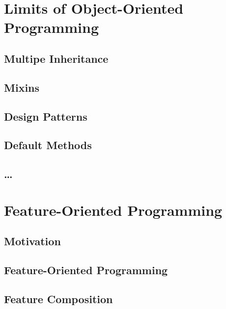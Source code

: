

\subtitle{7. Language-Based Techniques}
\author{Thomas Thüm}





\section{Limits of Object-Oriented Programming}

\subsection{Multipe Inheritance}
\subsection{Mixins}
\subsection{Design Patterns}
\subsection{Default Methods}
\subsection{\ldots}

%

\lessonslearned{
	\item \ldots
}{
	\item \ldots
}{
	\ldots
}

\sectionend

\section{Feature-Oriented Programming}

\subsection{Motivation}
\subsection{Feature-Oriented Programming}
\subsection{Feature Composition}
